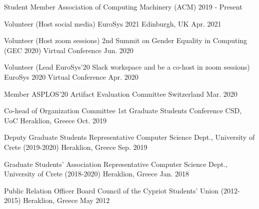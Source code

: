 \begin{cvhonors}
	\cvhonor
	{Student Member} %
	{Association of Computing Machinery (ACM)} %
	{} %
	{2019 - Present} %

	\cvhonor
	{Volunteer (Host social media)} %
	{EuroSys 2021} %
	{Edinburgh, UK} %
	{Apr. 2021} %

	\cvhonor
	{Volunteer (Host zoom sessions)} %
	{2nd Summit on Gender Equality in Computing (GEC 2020)} %
	{Virtual Conference} %
	{Jun. 2020} %


	\cvhonor
	{Volunteer (Lead EuroSys'20 Slack workspace and be a co-host in
		zoom sessions)} %
	{EuroSys 2020} %
	{Virtual Conference} %
	{Apr. 2020} %


	\cvhonor
	{Member} %
	{ASPLOS'20 Artifact Evaluation Committee} %
	{Switzerland} %
	{Mar. 2020} %

	\cvhonor
	{Co-head of Organization Committee} %
	{1st Graduate Students Conference CSD, UoC} %
	{Heraklion, Greece} %
	{Oct. 2019} %

	\cvhonor
	{Deputy Graduate Students Representative} %
	{Computer Science Dept., University of Crete (2019-2020)} %
	{Heraklion, Greece} %
	{Sep. 2019} %

	\cvhonor
	{Graduate Students' Association Representative} %
	{Computer Science Dept., University of Crete (2018-2020)} %
	{Heraklion, Greece} %
	{Jan. 2018} %

	\cvhonor
	{Public Relation Officer} %
	{Board Council of the Cypriot Students' Union (2012-2015)} %
	{Heraklion, Greece} %
	{May 2012} %

\end{cvhonors}
